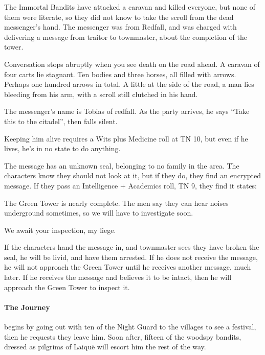 \begin{multicols}{2}
The Immortal Bandits have attacked a caravan and killed everyone, but none of them were literate, so they did not know to take the scroll from the dead messenger's hand.
The messenger was from Redfall, and was charged with delivering a message from \gls{traitor} to \gls{townmaster}, about the completion of the tower.

\begin{boxtext}

	Conversation stops abruptly when you see death on the road ahead.
	A caravan of four carts lie stagnant.
	Ten bodies and three horses, all filled with arrows.
	Perhaps one hundred arrows in total.
	A little at the side of the road, a man lies bleeding from his arm, with a scroll still clutched in his hand.

\end{boxtext}

The messenger's name is Tobias of \gls{redfall}.
As the party arrives, he says ``Take this to the citadel'', then falls silent.

Keeping him alive requires a Wits plus Medicine roll at TN 10, but even if he lives, he's in no state to do anything.

The message has an unknown seal, belonging to no family in the area.
The characters know they should not look at it, but if they do, they find an encrypted message.
If they pass an Intelligence + Academics roll, TN 9, they find it states:

\begin{speechtext}

	The Green Tower is nearly complete.
	The men say they can hear noises underground sometimes, so we will have to investigate soon.

	We await your inspection, my liege.

\end{speechtext}

If the characters hand the message in, and \gls{townmaster} sees they have broken the seal, he will be livid, and have them arrested.
If he does not receive the message, he will not approach the Green Tower until he receives another message, much later.
If he receives the message and believes it to be intact, then he will approach the Green Tower to inspect it.

\paragraph{The Journey}
begins by going out with ten of the Night Guard to the villages to see a festival, then he requests they leave him.
Soon after, fifteen of the woodspy bandits, dressed as pilgrims of Laiqu\"e will escort him the rest of the way.


\end{multicols}

